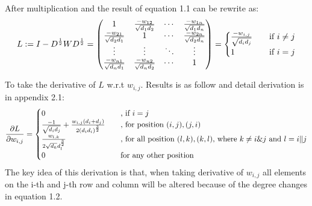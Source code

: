 \documentclass[final]{siamltexmm}
\begin{document}
After multiplication and the result of equation 1.1 can be rewrite as:
\begin{equation}
L := I - D^{1 \over 2}W D^{1 \over 2} =
\begin{pmatrix}
  1 & {-w_{12} \over \sqrt{d_1d_2}} & \cdots & {-w_{1n} \over \sqrt{d_1d_n}} \\
  {-w_{21} \over \sqrt{d_2d_1}} & 1 & \cdots & {-w_{2n} \over \sqrt{d_2d_n}} \\
  \vdots  & \vdots  & \ddots & \vdots  \\
  {-w_{n1} \over \sqrt{d_nd_1}} & {-w_{n2} \over \sqrt{d_nd_2}} & \cdots & 1 \\
\end{pmatrix}
=
\begin{cases}
  {-w_{i,j} \over \sqrt{d_id_j}}       & \quad \text{if } i \neq j\\
  1   & \quad \text{if } i = j\\
\end{cases}
\end{equation}

To take the derivative of $L$ w.r.t $w_{i,j}$. Results is as follow and detail derivation is in appendix 2.1:
\begin{equation}
{\partial L \over \partial w_{i,j}} =
\begin{cases}
  0       & \quad \text{, if $i = j$}\\
  {-1 \over \sqrt{d_id_j}} + {w_{i,j}(d_i+d_j) \over 2(d_id_i)^{3\over 2}} & \quad \text{, for position $(i,j), (j,i)$} \\
  {w_{l,k} \over 2\sqrt{d_k}d_l^{3\over2}}       & \quad \text{, for all position $(l,k), (k,l)$, where $k \neq i \& j$ and $l = i\|j$}\\
  0 & \quad \text{for any other position} \\
\end{cases}
\end{equation}
The key idea of this derivation is that, when taking derivative of $w_{i,j}$ all elements on the i-th and j-th row and column will be altered because of the degree changes in equation 1.2.
\end{document}
